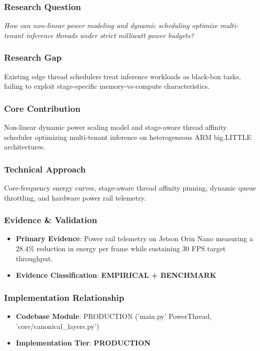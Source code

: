 \documentclass[11pt,letterpaper]{article}
\begin{document}
\subsubsection{Research Question}
\begin{tcolorbox}[colback=blue!3!white,colframe=blue!50!black,title=Primary Scientific Question]
\textit{How can non-\allowbreak linear power modeling and dynamic scheduling optimize multi-\allowbreak tenant inference threads under strict milliwatt power budgets?}
\end{tcolorbox}

\subsubsection{Research Gap}
Existing edge thread schedulers treat inference workloads as black-\allowbreak box tasks, failing to exploit stage-\allowbreak specific memory-\allowbreak vs-\allowbreak compute characteristics.

\subsubsection{Core Contribution}
Non-\allowbreak linear dynamic power scaling model and stage-\allowbreak aware thread affinity scheduler optimizing multi-\allowbreak tenant inference on heterogeneous ARM big.LITTLE architectures.

\subsubsection{Technical Approach}
Core-\allowbreak frequency energy curves, stage-\allowbreak aware thread affinity pinning, dynamic queue throttling, and hardware power rail telemetry.

\subsubsection{Evidence \& Validation}
\begin{itemize}[leftmargin=*]
    \item \textbf{Primary Evidence}: Power rail telemetry on Jetson Orin Nano measuring a $28.4\%$ reduction in energy per frame while sustaining 30 FPS target throughput.
    \item \textbf{Evidence Classification}: \textbf{EMPIRICAL + BENCHMARK}
\end{itemize}

\subsubsection{Implementation Relationship}
\begin{itemize}[leftmargin=*]
    \item \raggedright \textbf{Codebase Module}: PRODUCTION ('main.py' PowerThread, 'core/\allowbreak canonical\_\allowbreak layers.py')
    \item \textbf{Implementation Tier}: \textbf{PRODUCTION}
\end{itemize}
\end{document}
